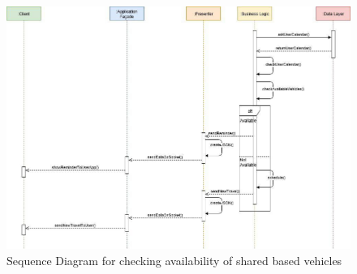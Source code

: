 \begin{figure}[H]
    \centering
    \includegraphics[scale=0.55]{Pictures/RunTimeView/reminder.jpg}
    \caption{Sequence Diagram for checking availability of shared based vehicles}
    \label{fig:sequenceReminder}
\end{figure}